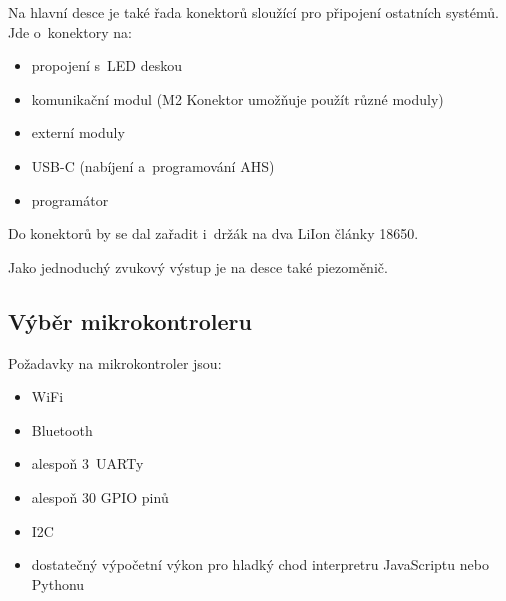 \newpage
Na hlavní desce je také řada konektorů sloužící pro připojení ostatních systémů.
Jde o~konektory na:
\begin{itemize}
    \item propojení s~LED deskou                                            %
    \item komunikační modul (M2 Konektor umožňuje použít různé moduly)      %
    \item externí moduly                                                    %
    \item USB-C (nabíjení a~programování AHS)                               %
    \item programátor                                                       %
\end{itemize}
Do konektorů by se dal zařadit i~držák na dva LiIon články 18650.

Jako jednoduchý zvukový výstup je na desce také piezoměnič.

\subsection{Výběr mikrokontroleru \label{subs:vyberMikrokontroleru}}
Požadavky na mikrokontroler jsou:
\begin{itemize}
    \item WiFi
    \item Bluetooth
    \item alespoň 3~UARTy
    \item alespoň 30 GPIO pinů
    \item I2C
    \item dostatečný výpočetní výkon pro hladký chod interpretru JavaScriptu nebo Pythonu
\end{itemize}

